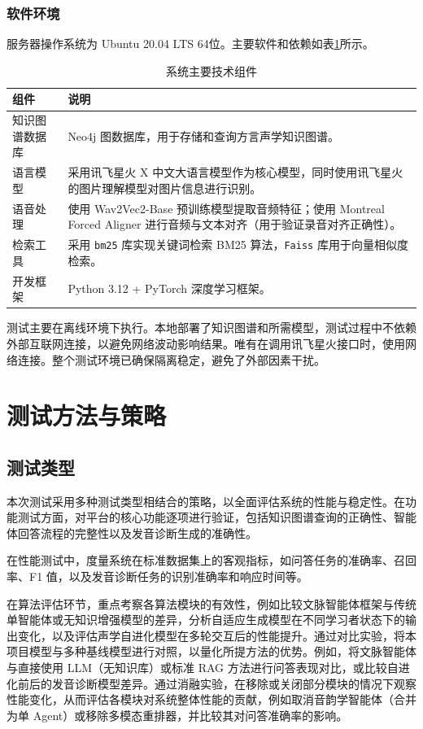 \subsection{软件环境}
服务器操作系统为 Ubuntu 20.04 LTS 64位。主要软件和依赖如表\ref{tab:tech-components}所示。
\begin{table}[H]\centering
\caption{系统主要技术组件}
\label{tab:tech-components}
\begin{tabular}{lp{10cm}}
\toprule[1pt]
\textbf{组件} & \textbf{说明} \\
\midrule[0.5pt]
知识图谱数据库 & Neo4j 图数据库，用于存储和查询方言声学知识图谱。 \\
语言模型 & 采用讯飞星火 X 中文大语言模型作为核心模型，同时使用讯飞星火的图片理解模型对图片信息进行识别。 \\
语音处理 & 使用 Wav2Vec2-Base 预训练模型提取音频特征；使用 Montreal Forced Aligner 进行音频与文本对齐（用于验证录音对齐正确性）。 \\
检索工具 & 采用 \texttt{bm25} 库实现关键词检索 BM25 算法，\texttt{Faiss} 库用于向量相似度检索。 \\
开发框架 & Python 3.12 + PyTorch 深度学习框架。 \\
\bottomrule[1pt]
\end{tabular}
\end{table}

测试主要在离线环境下执行。本地部署了知识图谱和所需模型，测试过程中不依赖外部互联网连接，以避免网络波动影响结果。唯有在调用讯飞星火接口时，使用网络连接。整个测试环境已确保隔离稳定，避免了外部因素干扰。

\chapter{测试方法与策略}

\section{测试类型}
本次测试采用多种测试类型相结合的策略，以全面评估系统的性能与稳定性。在功能测试方面，对平台的核心功能逐项进行验证，包括知识图谱查询的正确性、智能体回答流程的完整性以及发音诊断生成的准确性。

在性能测试中，度量系统在标准数据集上的客观指标，如问答任务的准确率、召回率、F1 值，以及发音诊断任务的识别准确率和响应时间等。

在算法评估环节，重点考察各算法模块的有效性，例如比较文脉智能体框架与传统单智能体或无知识增强模型的差异，分析自适应生成模型在不同学习者状态下的输出变化，以及评估声学自进化模型在多轮交互后的性能提升。通过对比实验，将本项目模型与多种基线模型进行对照，以量化所提方法的优势。例如，将文脉智能体与直接使用 LLM（无知识库）或标准 RAG 方法进行问答表现对比，或比较自进化前后的发音诊断模型差异。通过消融实验，在移除或关闭部分模块的情况下观察性能变化，从而评估各模块对系统整体性能的贡献，例如取消音韵学智能体（合并为单 Agent）或移除多模态重排器，并比较其对问答准确率的影响。

